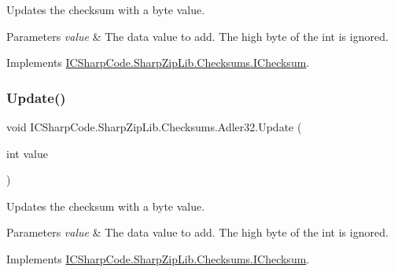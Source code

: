 Updates the checksum with a byte value. 


\begin{DoxyParams}{Parameters}
{\em value} & The data value to add. The high byte of the int is ignored. \\
\hline
\end{DoxyParams}


Implements \hyperlink{interface_i_c_sharp_code_1_1_sharp_zip_lib_1_1_checksums_1_1_i_checksum_a060abf360d877d0d9cf503fa6d6873d0}{I\+C\+Sharp\+Code.\+Sharp\+Zip\+Lib.\+Checksums.\+I\+Checksum}.

\mbox{\label{class_i_c_sharp_code_1_1_sharp_zip_lib_1_1_checksums_1_1_adler32_ae37b99f42678909be303136f2995b572}} 
\subsubsection{\texorpdfstring{Update()}{Update()}\hspace{0.1cm}{\footnotesize\ttfamily [2/6]}}
{\footnotesize\ttfamily void I\+C\+Sharp\+Code.\+Sharp\+Zip\+Lib.\+Checksums.\+Adler32.\+Update (\begin{DoxyParamCaption}\item[{int}]{value }\end{DoxyParamCaption})\hspace{0.3cm}{\ttfamily [inline]}}



Updates the checksum with a byte value. 


\begin{DoxyParams}{Parameters}
{\em value} & The data value to add. The high byte of the int is ignored. \\
\hline
\end{DoxyParams}


Implements \hyperlink{interface_i_c_sharp_code_1_1_sharp_zip_lib_1_1_checksums_1_1_i_checksum_a060abf360d877d0d9cf503fa6d6873d0}{I\+C\+Sharp\+Code.\+Sharp\+Zip\+Lib.\+Checksums.\+I\+Checksum}.

\mbox{\label{class_i_c_sharp_code_1_1_sharp_zip_lib_1_1_checksums_1_1_adler32_a37a55dd34c64e5b9ea40ef50a6e23afd}} 

